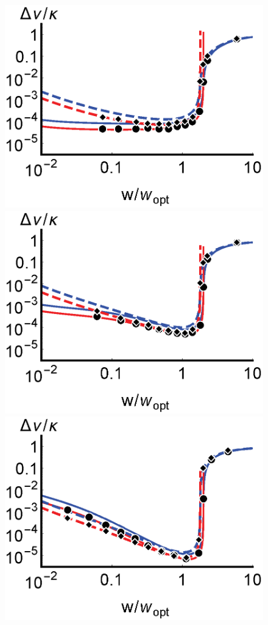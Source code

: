 \documentclass[aps,
twocolumn,
superscriptaddress,groupedaddress]{revtex4}
\begin{document}
\begin{figure}
\begin{center}
	\includegraphics[scale =0.51] {N10000LWS.eps}
	\hspace{-5.5mm} \includegraphics[scale =0.51] {N10000LWC.eps}
	\hspace{-5.5mm} \includegraphics[scale =0.51] {N10000LWL.eps}\\

\end{center}
\end{figure}
\end{document}
